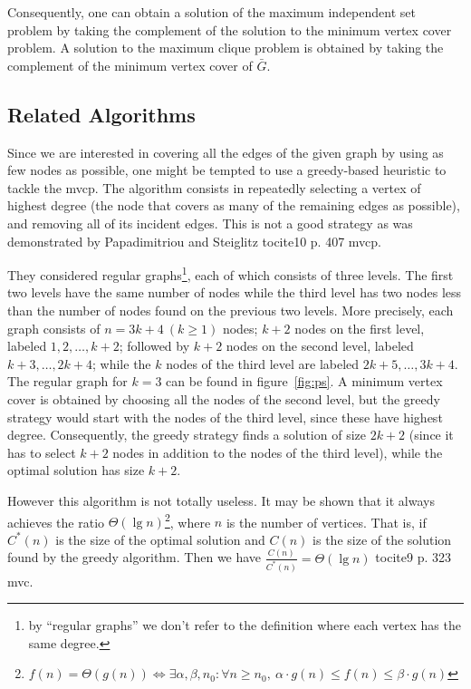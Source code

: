 \documentclass[12pt]{article}
\begin{document}
Consequently, one can obtain a solution of the maximum independent set
problem by taking the complement of the solution to the minimum vertex cover
problem. A solution to the maximum clique problem is obtained by
taking the complement of the minimum vertex cover of $\bar{G}$.

\subsection{Related Algorithms}
\label{sec:ra}
Since we are interested in covering all the edges of the
given graph by using as few nodes as possible, one might
be tempted to use a greedy-based heuristic to tackle the
mvcp.
The algorithm consists in repeatedly selecting a
vertex of highest degree (the node that covers as many
of the remaining edges as possible), and removing all
of its incident edges.
This is not a good strategy as was demonstrated
by Papadimitriou and Steiglitz tocite{10 p. 407 mvcp}.

They considered regular graphs\footnote{%
by ``regular graphs'' we don't refer to the definition where
each vertex has the same degree.
}, each of which consists of three levels.
The first two levels have the same
number of nodes while the third level has two nodes less
than the number of nodes found on the previous two
levels.
More precisely, each graph consists of $n = 3k + 4 \ (k \geq 1)$
nodes; $k+2$ nodes on the first level, labeled $1, 2, \dots, k+2$;
followed by $k+2$ nodes on the second level, labeled $k+3, \dots, 2k+4$;
while the $k$ nodes of the third level are labeled $2k+5, \dots, 3k+4$.
The regular graph for $k = 3$ can be found in figure~\ref{fig:ps}.
A minimum vertex cover is obtained by choosing all
the nodes of the second level, but the greedy strategy
would start with the nodes of the third level, since these
have highest degree. Consequently, the greedy strategy
finds a solution of size $2k + 2$ (since it has to select $k + 2$
nodes in addition to the nodes of the third level), while
the optimal solution has size $k + 2$.

However this algorithm is not totally useless. It may be shown that it always
achieves the ratio $\Theta(\lg n)$\footnote{$f(n) = \Theta(g(n)) \iff
\exists \alpha, \beta, n_0 : \forall n \geq n_0, \ 
\alpha \cdot g(n) \leq f(n) \leq \beta \cdot g(n)
$},
where $n$ is the number of vertices.
That is, if $C^*(n)$ is the size of the optimal
solution and $C(n)$ is the size of the solution found by the greedy
algorithm. Then we have $\frac{C(n)}{C^*(n)} = \Theta(\lg n)$ tocite{9 p. 323 mvc}.
\end{document}
